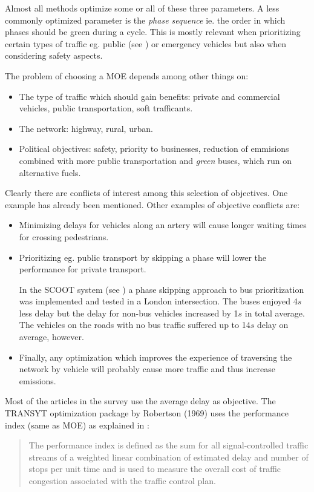 Almost all methods optimize some or all of these three parameters. A
less commonly optimized parameter is the \textit{phase sequence}
ie. the order in which phases should be green during a cycle. This is
mostly relevant when prioritizing certain types of traffic eg. public
(see \cite{scoot2004}) or emergency vehicles but also when considering
safety aspects.

The problem of choosing a MOE depends among other things on:

\begin{itemize}
\item The type of traffic which should gain benefits: private and commercial vehicles, public transportation, soft trafficants.
\item The network: highway, rural, urban.
\item Political objectives: safety, priority to businesses, reduction of emmisions combined with more public transportation and \textit{green} buses, which run on alternative fuels.
\end{itemize}

Clearly there are conflicts of interest among this selection of
objectives. One example has already been mentioned. Other examples of
objective conflicts are:

\begin{itemize}
\item Minimizing delays for vehicles along an artery will cause longer waiting times for crossing pedestrians.
\item Prioritizing eg. public transport by skipping a phase will lower the performance for private transport. 

In the SCOOT system (see \cite{scoot2004}) a phase skipping approach
to bus prioritization was implemented and tested in a London
intersection. The buses enjoyed 4$s$ less delay but the delay for
non-bus vehicles increased by 1$s$ in total average. The vehicles on
the roads with no bus traffic suffered up to 14$s$ delay on average,
however.
\item Finally, any optimization which improves the experience of traversing the network by vehicle will probably cause more traffic and thus increase emissions.
\end{itemize}

Most of the articles in the survey use the average delay as
objective. The TRANSYT optimization package by Robertson (1969) uses
the performance index (same as MOE) as explained in \cite{26}:

\begin{quote}
The performance index
is defined as the sum for all signal-controlled traffic streams of a
weighted linear combination of estimated delay and number
of stops per unit time and is used to measure the overall cost of
traffic congestion associated with the traffic control plan.
\end{quote}

